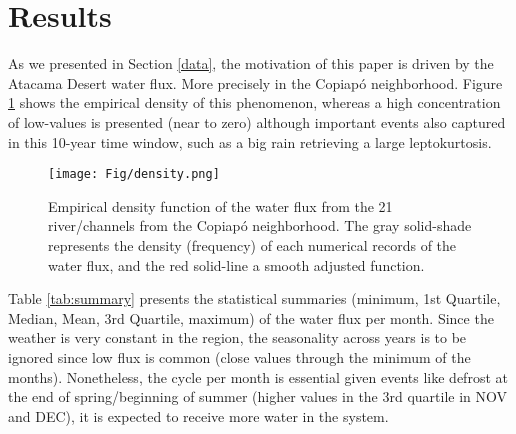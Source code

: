 \documentclass[]{interact}
\theoremstyle{plain}%
\theoremstyle{definition}
\theoremstyle{remark}
\begin{document}
\section{Results}\label{results}

As we presented in Section \ref{data}, the motivation of this paper is driven by the Atacama Desert water flux. More precisely in the Copiapó neighborhood. Figure \ref{fig:density} shows the empirical density of this phenomenon, whereas a high concentration of low-values is presented (near to zero) although important events also captured in this 10-year time window, such as a big rain retrieving a large leptokurtosis.

\begin{figure}[!ht]
    \centering
    \texttt{[image: Fig/density.png]}
    \caption{Empirical density function of the water flux from the 21 river/channels from the Copiapó neighborhood. The gray solid-shade represents the density (frequency) of each numerical records of the water flux, and the red solid-line a smooth adjusted function.}
    \label{fig:density}
\end{figure}

Table \ref{tab:summary} presents the statistical summaries (minimum, 1st Quartile, Median, Mean, 3rd Quartile, maximum) of the water flux per month. Since the weather is very constant in the region, the seasonality across years is to be ignored since low flux is common (close values through the minimum of the months). Nonetheless, the cycle per month is essential given events like defrost at the end of spring/beginning of summer (higher values in the 3rd quartile in NOV and DEC), it is expected to receive more water in the system.
\end{document}
